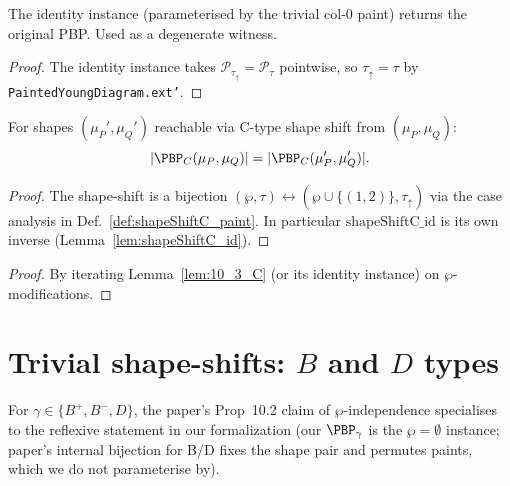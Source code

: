 \begin{lemma}
  \label{lem:shapeShiftC_id}
  \leanok
  The identity instance (parameterised by the trivial col-0 paint)
  returns the original PBP. Used as a degenerate witness.
\end{lemma}
\begin{proof}
  \leanok
  The identity instance takes $\mathcal{P}_{\tau_\uparrow} = \mathcal{P}_\tau$ pointwise, so $\tau_\uparrow = \tau$ by \texttt{PaintedYoungDiagram.ext'}.
\end{proof}


\begin{lemma}
  \label{lem:10_3_C}
  \leanok
  For shapes $(\mu_P', \mu_Q')$ reachable via C-type shape shift from $(\mu_P, \mu_Q)$:
  \[ |\PBP_C(\mu_P, \mu_Q)| = |\PBP_C(\mu_P', \mu_Q')|. \]
\end{lemma}
\begin{proof}
  \leanok
  The shape-shift is a bijection $(\wp, \tau) \leftrightarrow (\wp \cup \{(1,2)\}, \tau_\uparrow)$ via the case analysis in Def.~\ref{def:shapeShiftC_paint}. In particular $\mathrm{shapeShiftC\_id}$ is its own inverse (Lemma~\ref{lem:shapeShiftC_id}).
\end{proof}


\begin{proposition}
  \label{prop:10_2_C}
  \leanok
\end{proposition}
\begin{proof}
  \leanok
  By iterating Lemma~\ref{lem:10_3_C} (or its identity instance) on $\wp$-modifications.
\end{proof}


\section{Trivial shape-shifts: $B$ and $D$ types}

For $\gamma \in \{B^+, B^-, D\}$, the paper's Prop~10.2 claim of $\wp$-independence
specialises to the reflexive statement in our formalization (our $\PBP_\gamma$ is
the $\wp = \emptyset$ instance; paper's internal bijection for B/D fixes the
shape pair and permutes paints, which we do not parameterise by).

